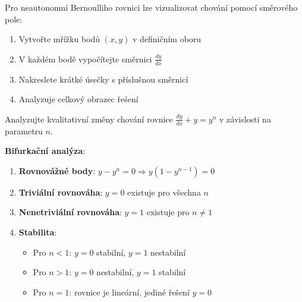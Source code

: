 \vspace{0.8\baselineskip}

\begin{method}
\label{met:smerove-pole}
Pro neautonomní Bernoulliho rovnici lze vizualizovat chování pomocí směrového pole:

\begin{enumerate}
\item Vytvořte mřížku bodů $(x, y)$ v definičním oboru
\item V každém bodě vypočítejte směrnici $\frac{dy}{dx}$
\item Nakreslete krátké úsečky s příslušnou směrnicí
\item Analyzuje celkový obrazec řešení
\end{enumerate}
\end{method}

\vspace{0.6\baselineskip}

\begin{example}
\label{ex:bifurkacni-diagram}
Analyzujte kvalitativní změny chování rovnice $\frac{dy}{dx} + y = y^n$ v závislosti na parametru $n$.

\textbf{Bifurkační analýza}:
\begin{enumerate}
\item \textbf{Rovnovážné body}: $y - y^n = 0 \Rightarrow y(1 - y^{n-1}) = 0$
\item \textbf{Triviální rovnováha}: $y = 0$ existuje pro všechna $n$
\item \textbf{Nenetriviální rovnováha}: $y = 1$ existuje pro $n \neq 1$
\item \textbf{Stabilita}:
\begin{itemize}
\item Pro $n < 1$: $y = 0$ stabilní, $y = 1$ nestabilní
\item Pro $n > 1$: $y = 0$ nestabilní, $y = 1$ stabilní
\item Pro $n = 1$: rovnice je lineární, jediné řešení $y = 0$
\end{itemize}
\end{enumerate}

\begin{center}
\end{center}
\end{example}

